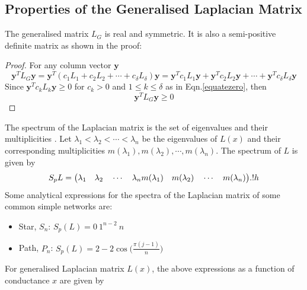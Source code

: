\documentclass[10pt,a4paper]{article}
\begin{document}
		    \subsection{Properties of the Generalised Laplacian Matrix }
		    The generalised matrix $L_G$ is real and symmetric. It is also a semi-positive definite matrix as shown in the proof:
		    \begin{proof}
		    	For any column vector $\mathbf{y}$
		    	\begin{equation}
		    	\mathbf{y}^T L_{G} \mathbf{y} = \mathbf{y}^T(c_{1}L_{1} + c_{2}L_{2} + \cdots + c_{\delta}L_{\delta} )\mathbf{y}
		    	= \mathbf{y}^Tc_{1}L_{1}\mathbf{y} + \mathbf{y}^Tc_{2}L_{2}\mathbf{y} + \cdots + \mathbf{y}^Tc_{\delta}L_{\delta}\mathbf{y} 
		    	\end{equation}
		    	Since $\mathbf{y}^Tc_{k}L_{k}\mathbf{y} \geq 0$ for $c_{k}>0$ and $1 \leq k \leq \delta$ as in Eqn.\ref{equatezero}, then
		    	\begin{equation}
		    	\mathbf{y}^T L_{G} \mathbf{y} \geq 0	
		    	\end{equation}
		    \end{proof}
		    The spectrum of the Laplacian matrix is the set of eigenvalues and their multiplicities \citep{estrada2011epidemic}. Let $\lambda_1 < \lambda_2 < \cdots < \lambda_n$ be the eigenvalues of $L(x)$ and their corresponding multiplicities $m(\lambda_1), m(\lambda_2), \cdots, m(\lambda_n)$. The spectrum of $L$ is given by
		    \begin{equation}
		    S_p L = \big(\lambda_1 \quad \lambda_2 \quad \cdots \quad \lambda_n \\
		    m(\lambda_1) \quad m(\lambda_2) \quad \cdots \quad m(\lambda_n)  \big).!h
		    \end{equation}
		    Some analytical expressions for the spectra of the Laplacian matrix of some common simple networks are:\\
		    \begin{itemize}
		    	\item Star, $S_n$: $S_p(L) = {0~ 1^{n-2}~ n}$\\
		    	\item Path, $P_n$: $S_p(L) = {2-2\cos\big( \frac{\pi(j-1)}{n}\big) }$
		    \end{itemize}
		    For generalised Laplacian matrix $L(x)$, the above expressions as a function of conductance $x$ are given by
\end{document}
